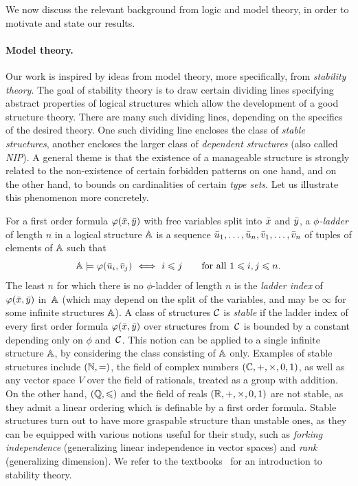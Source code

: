 We now discuss the relevant background from logic and model theory, in order to motivate and state our results.



\paragraph{Model theory.}Our work is inspired by ideas from model theory,  more specifically, from \emph{stability theory}.
  The goal of {stability theory}
  is to draw certain dividing lines
  specifying abstract properties of 
  logical structures which allow the development 
  of a good structure theory. There are many such dividing lines, depending on the specifics of the desired theory. One such dividing line encloses the class of \emph{stable structures}, 
  another encloses the larger class of \emph{dependent structures} (also called \emph{NIP}). 
  A general theme is that the existence of a manageable structure is strongly related to
  the non-existence of certain forbidden patterns on one hand,
and on the other hand, to bounds on cardinalities
of certain \emph{type sets}.  
  Let us illustrate this phenomenon more concretely.

For a first order formula 
$\varphi(\bar{x},\bar{y})$ 
 with free variables
split into  $\bar{x}$ and $\bar{y}$,
a \emph{$\phi$-ladder}
of length $n$ in a logical structure $\mathbb A$ is a sequence $\bar{u}_1,\ldots, \bar{u}_{n},
\bar{v}_1,\ldots, \bar{v}_{n}$ of tuples of elements of $\mathbb A$ 
such that 
$$\strA\models\phi(\tup{u}_i,\tup{v}_j)\ \Longleftrightarrow\ i\leq j\qquad \text {for all $1\leq i,j\le n$.}$$
The least  $n$ for which 
there is no $\phi$-ladder of length $n$ is 
the \emph{ladder index} 
of $\varphi(\bar{x},\bar{y})$ in~$\mathbb A$ (which may depend on the split of the
variables, and may be $\infty$ for some infinite structures $\mathbb A$). A class of structures $\mathcal{C}$ is \emph{stable} if
the ladder index of every first order formula $\varphi(\bar{x},\bar{y})$ over
structures from~$\mathcal{C}$ is bounded by a constant depending only on $\phi$ 
and~$\mathcal{C}$. This notion can be applied to a single infinite structure $\mathbb A$, by considering the class consisting of $\mathbb A$ only.
Examples of stable structures include $(\mathbb N,=)$,
the field of complex numbers $(\mathbb C,+,\times,0,1)$,
as well as any vector space $V$ over the field of rationals, treated as a group with addition. On the other hand, $(\mathbb Q,\leqslant)$ and the field of reals $(\mathbb R,+,\times,0,1)$ are not stable,
as they admit a linear ordering which is definable by a first order formula.
Stable structures turn out to have more graspable  structure than unstable ones, as they can be equipped with various notions 
useful for their study, such as
\emph{forking independence} (generalizing linear independence in vector spaces)
and \emph{rank} (generalizing dimension).
We refer to the textbooks~\cite{pillay,tent2012course} for an introduction to stability theory.

